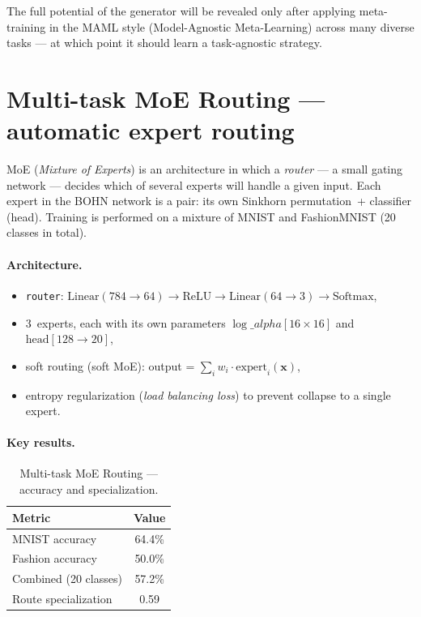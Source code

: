 \documentclass[11pt,a4paper]{report}
\begin{document}
The full potential of the generator will be revealed only after applying meta-training in the MAML style
(Model-Agnostic Meta-Learning) across many diverse tasks --- at which point it should
learn a task-agnostic strategy.


\section{Multi-task MoE Routing --- automatic expert routing}

MoE (\emph{Mixture of Experts}) is an architecture in which
a \emph{router} --- a small gating network --- decides which of several experts
will handle a given input. Each expert in the BOHN network is a pair:
its own Sinkhorn permutation~+ classifier (head).
Training is performed on a mixture of MNIST and FashionMNIST (20 classes in total).

\paragraph{Architecture.}
\begin{itemize}
    \item \texttt{router}: $\text{Linear}(784 \to 64) \to \text{ReLU} \to \text{Linear}(64 \to 3) \to \text{Softmax}$,
    \item 3~experts, each with its own parameters $\log\_alpha[16 \times 16]$ and $\text{head}[128 \to 20]$,
    \item soft routing (soft MoE): output = $\sum_i w_i \cdot \text{expert}_i(\mathbf{x})$,
    \item entropy regularization (\emph{load balancing loss}) to prevent collapse to a single expert.
\end{itemize}

\paragraph{Key results.}

\begin{table}[h!]
\centering
\caption{Multi-task MoE Routing --- accuracy and specialization.}
\begin{tabular}{l c}
\hline
\textbf{Metric} & \textbf{Value} \\
\hline
MNIST accuracy & 64.4\% \\
Fashion accuracy & 50.0\% \\
Combined (20 classes) & 57.2\% \\
Route specialization & 0.59 \\
\hline
\end{tabular}
\label{tab:moe_routing_results}
\end{table}
\end{document}
